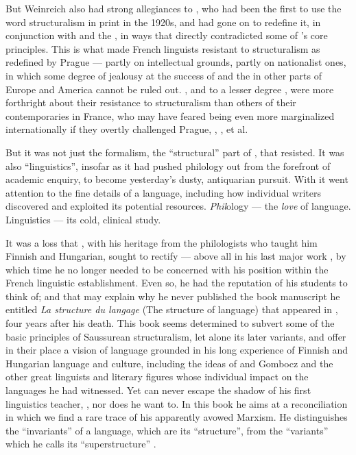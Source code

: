 \documentclass[output=paper]{langscibook}
\begin{document}
But Weinreich also had strong allegiances to {\Jakobson}, who had been the first to use the word structuralism in print in the 1920s, and had gone on to redefine it, in conjunction with {\Trubetzkoy} and the {\PragueSchool}, in ways that directly contradicted some of {\Saussure}'s core principles. This is what made French linguists resistant to structuralism as redefined by Prague — partly on intellectual grounds, partly on nationalist ones, in which some degree of jealousy at the success of {\Jakobson} and the {\PragueSchool} in other parts of Europe and America cannot be ruled out. {\Sauvageot}, and to a lesser degree {\Benveniste}, were more forthright about their resistance to structuralism than others of their contemporaries in France, who may have feared being even more marginalized internationally if they overtly challenged Prague, {\Jakobson}, {\Trubetzkoy}, {\Hjelmslev} et al.

But it was not just the formalism, the ``structural'' part of , that {\Sauvageot} resisted. It was also ``linguistics'', insofar as it had pushed philology out from the forefront of academic enquiry, to become yesterday's dusty, antiquarian pursuit. With it went attention to the fine details of a language, including how individual writers discovered and exploited its potential resources. \emph{Phil}ology — the \emph{love} of language. Linguistics — its cold, clinical study.

It was a loss that {\Sauvageot}, with his heritage from the philologists who taught him Finnish and Hungarian, sought to rectify — above all in his last major work \citep{Sauvageot1973}, by which time he no longer needed to be concerned with his position within the French linguistic establishment. Even so, he had the reputation of his students to think of; and that may explain why he never published the book manuscript he entitled \emph{La structure du langage} (The structure of language) that appeared in \citeyear{Sauvageot1992}, four years after his death. This book seems determined to subvert some of the basic principles of Saussurean structuralism, let alone its later variants, and offer in their place a vision of language grounded in his long experience of Finnish and Hungarian language and culture, including the ideas of {} and Gombocz and the other great linguists and literary figures whose individual impact on the languages he had witnessed. Yet {\Sauvageot} can never escape the shadow of his first linguistics teacher, {\Meillet}, nor does he want to. In this book he aims at a reconciliation in which we find a rare trace of his apparently avowed Marxism. He distinguishes the ``invariants'' of a language, which are its ``structure'', from the ``variants'' which he calls its ``superstructure'' \citep[18]{Sauvageot1992}.
\end{document}
